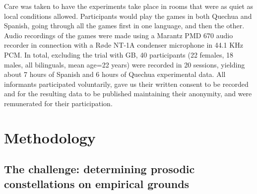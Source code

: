 \documentclass[output=paper]{LSP/langsci}
\begin{document}
Care was taken to have the experiments take place in rooms that were as quiet as local conditions allowed. Participants would play the games in both Quechua and Spanish, going through all the games first in one language, and then the other. Audio recordings of the games were made using a Marantz PMD 670 audio recorder in connection with a Røde NT-1A condenser microphone in 44.1 KHz PCM. In total, excluding the trial with GB, 40 participants (22 females, 18 males, all bilinguals, mean age=22 years) were recorded in 20 sessions, yielding about 7 hours of Spanish and 6 hours of Quechua experimental data. All informants participated voluntarily, gave us their written consent to be recorded and for the resulting data to be published maintaining their anonymity, and were remunerated for their participation.   

\section{Methodology}
\label{sec:buc:3}
\subsection{The challenge: determining prosodic constellations on empirical grounds}
\end{document}
